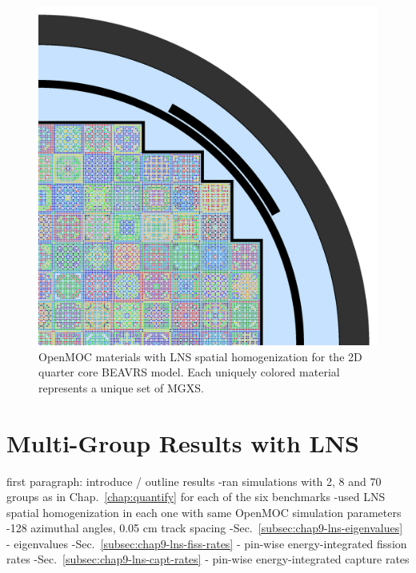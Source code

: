 \begin{figure}[h!]
\centering
\includegraphics[width=\linewidth]{figures/patterns/lns/full-core/materials}
\caption{}
\caption[Depiction of LNS spatially homogenized materials for quarter core BEAVRS]{OpenMOC materials with \ac{LNS} spatial homogenization for the 2D quarter core \ac{BEAVRS} model. Each uniquely colored material represents a unique set of \ac{MGXS}.}
\label{fig:chap9-lns-materials-beavrs}
\end{figure}


\section{Multi-Group Results with LNS}
\label{subsec:chap9-lns-results}

first paragraph: introduce / outline results
-ran simulations with 2, 8 and 70 groups as in Chap.~\ref{chap:quantify} for each of the six benchmarks
-used \ac{LNS} spatial homogenization in each one with same OpenMOC simulation parameters
  -128 azimuthal angles, 0.05 cm track spacing
-Sec.~\ref{subsec:chap9-lns-eigenvalues} - eigenvalues
-Sec.~\ref{subsec:chap9-lns-fiss-rates} - pin-wise energy-integrated fission rates
-Sec.~\ref{subsec:chap9-lns-capt-rates} - pin-wise energy-integrated capture rates

